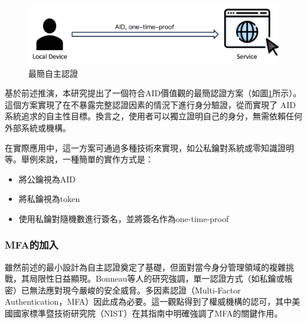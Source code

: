 \begin{figure}
  \centering
  \includegraphics[width=\linewidth]{figures/min-aid.png}
  \caption{最簡自主認證}
  \label{fig:min-aid}
\end{figure}
基於前述推演，本研究提出了一個符合AID價值觀的最簡認證方案（如圖\ref{fig:min-aid}所示）。這個方案實現了在不暴露完整認證因素的情況下進行身分驗證，從而實現了 AID 系統追求的自主性目標。換言之，使用者可以獨立證明自己的身分，無需依賴任何外部系統或機構。

在實際應用中，這一方案可通過多種技術來實現，如公私鑰對系統或零知識證明等。舉例來說，一種簡單的實作方式是：
\begin{itemize}
  \item 將公鑰視為AID
  \item 將私鑰視為token
  \item 使用私鑰對隨機數進行簽名，並將簽名作為one-time-proof
\end{itemize}
\subsubsection{MFA的加入}
雖然前述的最小設計為自主認證奠定了基礎，但面對當今身分管理領域的複雜挑戰，其局限性日益顯現。Bonneau等人\cite{bonneau2012mfa}的研究強調，單一認證方式（如私鑰或帳密）已無法應對現今嚴峻的安全威脅。多因素認證（Multi-Factor Authentication，MFA）因此成為必要。這一觀點得到了權威機構的認可，其中美國國家標準暨技術研究院（NIST）在其指南中明確強調了MFA的關鍵作用\cite{NIST800-63-3}。


